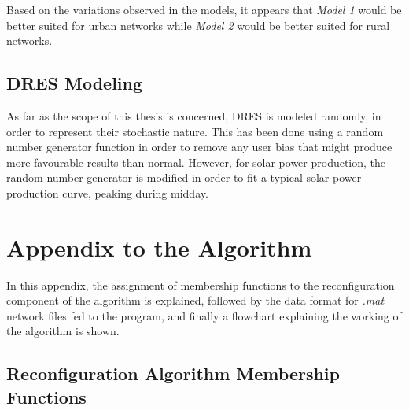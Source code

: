 Based on the variations observed in the models, it appears that \emph{Model 1} would be better suited for urban networks while \emph{Model 2} would be better suited for rural networks.

\section{DRES Modeling}

As far as the scope of this thesis is concerned, DRES is modeled randomly, in order to represent their stochastic nature. This has been done using a random number generator function in order to remove any user bias that might produce more favourable results than normal. However, for solar power production, the random number generator is modified in order to fit a typical solar power production curve, peaking during midday.

\chapter{Appendix to the Algorithm}

\begin{introduction}
In this appendix, the assignment of membership functions to the reconfiguration component of the algorithm is explained, followed by the data format for \emph{.mat} network files fed to the program, and finally a flowchart explaining the working of the algorithm is shown.
\end{introduction}

\section*{Reconfiguration Algorithm Membership Functions}

